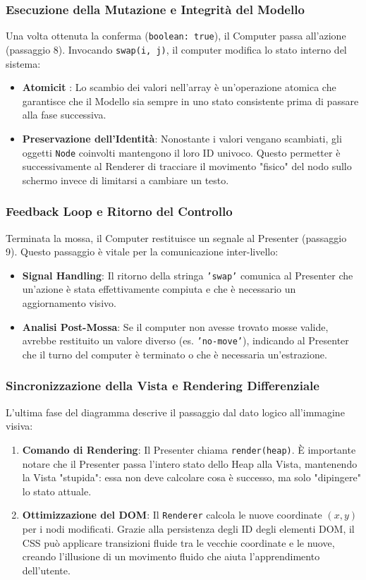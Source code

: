 \documentclass[openany]{theme/uniprthesis}
\begin{document}
\subsubsection{Esecuzione della Mutazione e Integrità del Modello}
Una volta ottenuta la conferma (\texttt{boolean: true}), il Computer passa all'azione (passaggio 8). Invocando \texttt{swap(i, j)}, il computer modifica lo stato interno del sistema:
\begin{itemize}
    \item \textbf{Atomicit }: Lo scambio dei valori nell'array è un'operazione atomica che garantisce che il Modello sia sempre in uno stato consistente prima di passare alla fase successiva.
    \item \textbf{Preservazione dell'Identità}: Nonostante i valori vengano scambiati, gli oggetti \texttt{Node} coinvolti mantengono il loro ID univoco. Questo permetter è successivamente al Renderer di tracciare il movimento "fisico" del nodo sullo schermo invece di limitarsi a cambiare un testo.
\end{itemize}

\subsubsection{Feedback Loop e Ritorno del Controllo}
Terminata la mossa, il Computer restituisce un segnale al Presenter (passaggio 9). Questo passaggio è vitale per la comunicazione inter-livello:
\begin{itemize}
    \item \textbf{Signal Handling}: Il ritorno della stringa \texttt{'swap'} comunica al Presenter che un'azione è stata effettivamente compiuta e che è necessario un aggiornamento visivo.
    \item \textbf{Analisi Post-Mossa}: Se il computer non avesse trovato mosse valide, avrebbe restituito un valore diverso (es. \texttt{'no-move'}), indicando al Presenter che il turno del computer è terminato o che è necessaria un'estrazione.
\end{itemize}

\subsubsection{Sincronizzazione della Vista e Rendering Differenziale}
L'ultima fase del diagramma descrive il passaggio dal dato logico all'immagine visiva:
\begin{enumerate}
    \item \textbf{Comando di Rendering}: Il Presenter chiama \texttt{render(heap)}. È importante notare che il Presenter passa l'intero stato dello Heap alla Vista, mantenendo la Vista "stupida": essa non deve calcolare cosa è successo, ma solo "dipingere" lo stato attuale.
    \item \textbf{Ottimizzazione del DOM}: Il \texttt{Renderer} calcola le nuove coordinate $(x, y)$ per i nodi modificati. Grazie alla persistenza degli ID degli elementi DOM, il CSS può applicare transizioni fluide tra le vecchie coordinate e le nuove, creando l'illusione di un movimento fluido che aiuta l'apprendimento dell'utente.
\end{enumerate}
\end{document}
